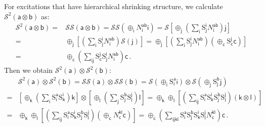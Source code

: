 \documentclass[11pt,nofootinbib,preprint]{revtex4-1}
\begin{document}
For excitations that have hierarchical shrinking structure, we calculate $\mathcal{S} ^2\left( \mathsf{a}\otimes \mathsf{b} \right)$ as:
\begin{align}
	\mathcal{S} ^2\left( \mathsf{a}\otimes \mathsf{b} \right) =&\mathcal{S} \mathcal{S} \left( \mathsf{a}\otimes \mathsf{b} \right) =\mathcal{S} \mathcal{S} \left( \oplus _{\mathsf{i}}N_{\mathsf{i}}^{\mathsf{ab}}\mathsf{i} \right) =\mathcal{S} \left[ \oplus _{\mathsf{j}}\left( \sum_{\mathsf{i}}{{\mathrm{S}}_{\mathsf{j}}^{\mathsf{i}}N_{\mathsf{i}}^{\mathsf{ab}}} \right) \mathsf{j} \right] \nonumber
	\\
	=&\oplus _{\mathsf{j}}\left[ \left( \sum_{\mathsf{i}}{{\mathrm{S}}_{\mathsf{j}}^{\mathsf{i}}N_{\mathsf{i}}^{\mathsf{ab}}} \right) \mathcal{S} \left( \mathsf{j} \right) \right] =\oplus _{\mathsf{j}}\left[ \left( \sum_{\mathsf{i}}{{\mathrm{S}}_{\mathsf{j}}^{\mathsf{i}}N_{\mathsf{i}}^{\mathsf{ab}}} \right) \left( \oplus _{\mathsf{c}}\mathrm{S}_{\mathsf{c}}^{\mathsf{j}}\mathsf{c} \right) \right]\nonumber
	\\
	=&\oplus _{\mathsf{c}}\left( \sum_{\mathsf{ij}}{\mathrm{S}_{\mathsf{c}}^{\mathsf{j}}{\mathrm{S}}_{\mathsf{j}}^{\mathsf{i}}N_{\mathsf{i}}^{\mathsf{ab}}} \right) \mathsf{c}\,.
	\label{eq16}
\end{align}
Then we obtain $\mathcal{S} ^2\left( \mathsf{a} \right) \otimes \mathcal{S} ^2\left( \mathsf{b} \right)$:
\begin{align}
	&\mathcal{S} ^2\left( \mathsf{a} \right) \otimes \mathcal{S} ^2\left( \mathsf{b} \right) =\mathcal{S} \mathcal{S} \left( \mathsf{a} \right) \otimes \mathcal{S} \mathcal{S} \left( \mathsf{b} \right) =\mathcal{S} \left( \oplus _{\mathsf{i}}{\mathrm{S}}_{\mathsf{i}}^{\mathsf{a}}\mathsf{i} \right) \otimes \mathcal{S} \left( \oplus _{\mathsf{j}}{\mathrm{S}}_{\mathsf{j}}^{\mathsf{b}}\mathsf{j} \right) \nonumber
	\\
	=&\left[ \oplus _{\mathsf{k}}\left( \sum_{\mathsf{i}}{{\mathrm{S}}_{\mathsf{i}}^{\mathsf{a}}\mathrm{S}_{\mathsf{k}}^{\mathsf{i}}} \right) \mathsf{k} \right] \otimes \left[ \oplus _{\mathsf{l}}\left( \sum_{\mathsf{j}}{{\mathrm{S}}_{\mathsf{j}}^{\mathsf{b}}\mathrm{S}_{\mathsf{l}}^{\mathsf{j}}} \right) \mathsf{l} \right] =\oplus _{\mathsf{k}}\oplus _{\mathsf{l}}\left[ \left( \sum_{\mathsf{ij}}{{\mathrm{S}}_{\mathsf{i}}^{\mathsf{a}}\mathrm{S}_{\mathsf{k}}^{\mathsf{i}}{\mathrm{S}}_{\mathsf{j}}^{\mathsf{b}}\mathrm{S}_{\mathsf{l}}^{\mathsf{j}}} \right) \left( \mathsf{k}\otimes \mathsf{l} \right) \right] \nonumber
	\\
	=&\oplus _{\mathsf{k}}\oplus _{\mathsf{l}}\left[ \left( \sum_{\mathsf{ij}}{{\mathrm{S}}_{\mathsf{i}}^{\mathsf{a}}\mathrm{S}_{\mathsf{k}}^{\mathsf{i}}{\mathrm{S}}_{\mathsf{j}}^{\mathsf{b}}\mathrm{S}_{\mathsf{l}}^{\mathsf{j}}} \right) \left( \oplus _{\mathsf{c}}N_{\mathsf{c}}^{\mathsf{kl}}\mathsf{c} \right) \right] =\oplus _{\mathsf{c}}\left( \sum_{\mathsf{ijkl}}{{\mathrm{S}}_{\mathsf{i}}^{\mathsf{a}}{\mathrm{S}}_{\mathsf{j}}^{\mathsf{b}}\mathrm{S}_{\mathsf{k}}^{\mathsf{i}}\mathrm{S}_{\mathsf{l}}^{\mathsf{j}}}N_{\mathsf{c}}^{\mathsf{kl}} \right) \mathsf{c}\,.
	\label{eq18}
\end{align}
\end{document}
